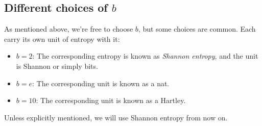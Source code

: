 \documentclass[12pt, a4paper]{article}
\numberwithin{equation}{section}
\begin{document}
\subsection{Different choices of $b$}
As mentioned above, we're free to choose $b$, but some choices are common. Each carry its own unit of entropy with it:
\begin{itemize}
\item $b=2$: The corresponding entropy is known as \textit{Shannon entropy}, and the unit is Shannon or simply bits.
\item $b=e$: The corresponding unit is known as a nat.
\item $b=10$: The corresponding unit is known as a Hartley.
\end{itemize}
Unless explicitly mentioned, we will use Shannon entropy from now on.
\end{document}
